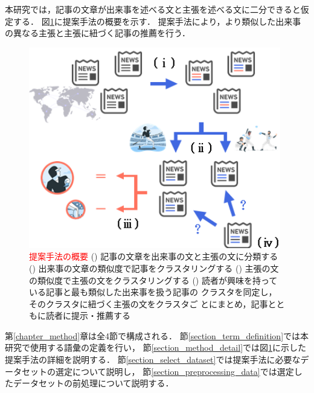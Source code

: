 \documentclass[12pt,a4j]{jreport}
\begin{document}
本研究では，記事の文章が出来事を述べる文と主張を述べる文に二分できると仮定する．
図\ref{fig_method_abstract}に提案手法の概要を示す．
提案手法により，より類似した出来事の異なる主張と主張に紐づく記事の推薦を行う．

\begin{figure}[H]
	\centering
	\includegraphics[keepaspectratio, width=110mm]{img/method_abstract.png}
	\caption{
    \textcolor{red}{提案手法の概要}
    \newline
    \qquad\quad()
    記事の文章を出来事の文と主張の文に分類する
    \newline
    \qquad\quad()
    出来事の文章の類似度で記事をクラスタリングする
    \newline
    \qquad\quad()
    主張の文の類似度で主張の文をクラスタリングする
    \newline
    \qquad\quad()
    読者が興味を持っている記事と最も類似した出来事を扱う記事の
    \newline
    \qquad\qquad\quad
    クラスタを同定し，そのクラスタに紐づく主張の文をクラスタご
    \newline
    \qquad\qquad\quad
    とにまとめ，記事とともに読者に提示・推薦する
  }
	\label{fig_method_abstract}
\end{figure}

第\ref{chapter_method}章は全4節で構成される．
節\ref{section_term_definition}では本研究で使用する語彙の定義を行い，
節\ref{section_method_detail}では図\ref{fig_method_abstract}に示した提案手法の詳細を説明する．
節\ref{section_select_dataset}では提案手法に必要なデータセットの選定について説明し，
節\ref{section_preprocessing_data}では選定したデータセットの前処理について説明する．
\end{document}
